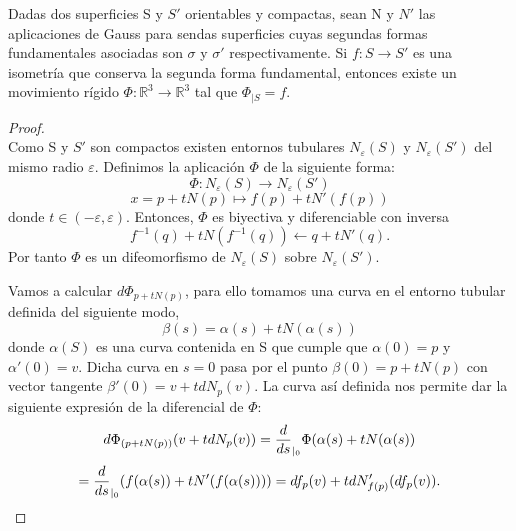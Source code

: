 \begin{teorema} \label{teo:rig2}
	Dadas dos superficies S y $S'$ orientables y compactas, sean N y $N'$ las aplicaciones de Gauss para sendas superficies cuyas segundas formas fundamentales asociadas son $\sigma$ y $\sigma'$ respectivamente.
	Si $f : S \to S'$ es una isometría que conserva la segunda forma fundamental, entonces existe un movimiento rígido $\Phi : \mathbb{R}^3 \to \mathbb{R}^3$ tal que $\Phi_{\mid S} = f$.
\end{teorema}

\begin{proof}
	${ }$\\
	
	Como S y $S'$ son compactos existen entornos tubulares $N_\varepsilon(S)$ y $N_\varepsilon(S')$ del mismo radio $\varepsilon$. Definimos la aplicación $\Phi$ de la siguiente forma:
	${ }$\\
	\[
	\Phi : N_\varepsilon(S) \longrightarrow N_\varepsilon(S')
	\]
	\[
	x = p + tN(p) \longmapsto f(p) + tN'(f(p))
	\]
	${ }$\\
	donde $t \in (-\varepsilon, \varepsilon)$. Entonces, $\Phi$ es biyectiva y diferenciable con inversa
	${ }$\\
	\[
	f^{-1}(q) + tN(f^{-1}(q)) \longleftarrow q + tN'(q).
	\]
	${ }$\\
	Por tanto $\Phi$ es un difeomorfismo de $N_\varepsilon(S)$ sobre $N_\varepsilon(S')$.
	
	${ }$\\	
	
	Vamos a calcular $d\Phi_{p+tN(p)}$, para ello tomamos una curva en el entorno tubular definida del siguiente modo,
	${ }$\\
	\[
	\beta(s) = \alpha(s) + tN(\alpha(s))
	\]
	${ }$\\
	donde $\alpha(S)$ es una curva contenida en S que cumple que $\alpha(0) = p$ y $\alpha'(0) = v$. Dicha curva en $s = 0$ pasa por el punto $\beta(0) = p + tN(p)$  con vector tangente $\beta'(0) = v + tdN_p(v)$. La curva así definida nos permite dar la siguiente expresión de la diferencial de $\Phi$:
	${ }$\\
	\[
	d\Phi_{(p + tN(p))}(v + tdN_p(v)) = \frac{d}{ds}_{\arrowvert_0} \Phi(\alpha(s) + tN(\alpha(s))
	\]
	\[
	= \frac{d}{ds}_{\arrowvert_0} (f(\alpha(s)) + tN'(f(\alpha(s)))) = df_p(v) + tdN'_{f(p)}(df_p(v)).
	\]
	

\end{proof}
